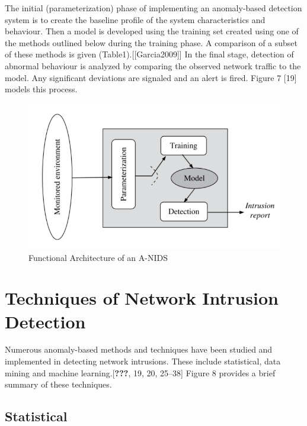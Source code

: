 \documentclass[11pt,]{article}
\begin{document}
The initial (parameterization) phase of implementing an anomaly-based
detection system is to create the baseline profile of the system
characteristics and behaviour. Then a model is developed using the
training set created using one of the methods outlined below during the
training phase. A comparison of a subset of these methods is given
(Table1).{[}{[}Garcia2009{]}{]} In the final stage, detection of
abnormal behaviour is analyzed by comparing the observed network traffic
to the model. Any significant deviations are signaled and an alert is
fired. Figure 7 {[}19{]} models this process.

\begin{figure}

{\centering \includegraphics{thesis_files/figure-latex/unnamed-chunk-10-1} 

}

\caption{Functional Architecture of an A-NIDS}\label{fig:unnamed-chunk-10}
\end{figure}

\newpage

\section{Techniques of Network Intrusion
Detection}\label{techniques-of-network-intrusion-detection}

Numerous anomaly-based methods and techniques have been studied and
implemented in detecting network intrusions. These include statistical,
data mining and machine learning.{[}\textbf{???}, 19, 20, 25--38{]}
Figure 8 provides a brief summary of these techniques.

\subsection{Statistical}\label{statistical}
\end{document}
